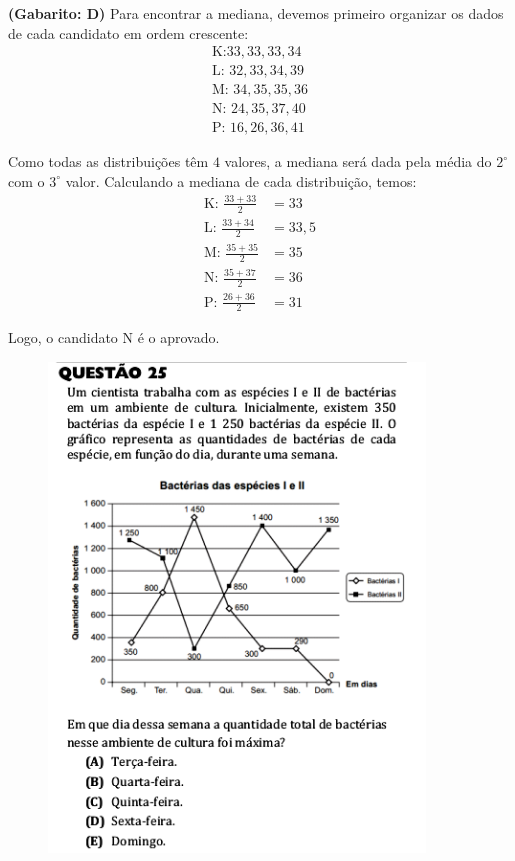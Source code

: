 \documentclass[a4paper]{article}
\begin{document}
\par\textbf{(Gabarito: D)} Para encontrar a mediana, devemos primeiro organizar os dados de cada candidato em ordem crescente:
\begin{align*}
\text{K:} 33, 33, 33, 34 \\
\text{L: } 32, 33, 34, 39 \\
\text{M: } 34, 35, 35, 36 \\
\text{N: }24, 35, 37, 40 \\
\text{P: }16, 26, 36, 41
\end{align*}
\par\vspace{0.3cm} Como todas as distribuições têm $4$ valores, a mediana será dada pela média do $2^\circ$ com o $3^\circ$ valor. Calculando a mediana de cada distribuição, temos:
\begin{align*}
\text{K: } \frac{33 + 33}{2} &= 33 \\
\text{L: } \frac{33+34}{2} &= 33,5 \\
\text{M: }\frac{35+35}{2} &= 35 \\
\text{N: }\frac{35 + 37}{2} &= 36 \\
\text{P: }\frac{26+36}{2} &= 31
\end{align*}
\par\vspace{0.3cm} Logo, o candidato N é o aprovado. 
\begin{figure}[H]
	\begin{center}
		\includegraphics[width=10cm]{L1Q25.png}
	\end{center}
\end{figure}
\end{document}
